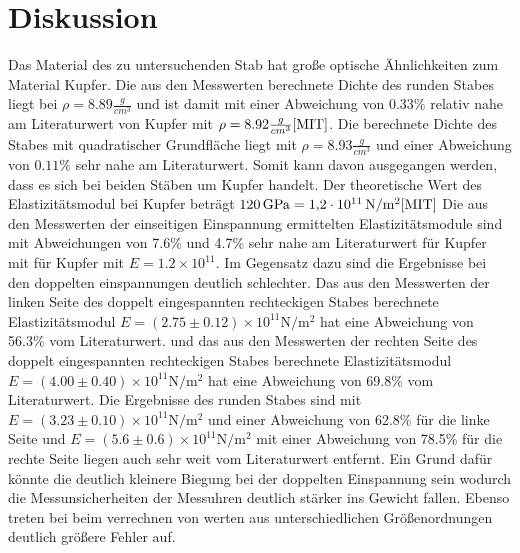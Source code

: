\section{Diskussion}
\label{sec:Diskussion}
Das Material des zu untersuchenden Stab hat große optische Ähnlichkeiten zum Material Kupfer. Die aus den Messwerten berechnete Dichte des runden Stabes liegt bei $\rho=8.89\frac{g}{cm^3}$ und ist damit mit einer Abweichung von $0.33\%$ relativ nahe am Literaturwert von Kupfer mit $\rho=8.92\frac{g}{cm^3} \cite{MIT}$.
\noindent Die berechnete Dichte des Stabes mit quadratischer Grundfläche liegt mit $\rho=8.93\frac{g}{cm^3}$ und einer Abweichung von $0.11\%$ sehr nahe am Literaturwert. Somit kann davon ausgegangen werden, dass es sich bei beiden Stäben um Kupfer handelt.
\noindent Der theoretische Wert des Elastizitätsmodul bei Kupfer beträgt $\qty{120}{\giga\pascal}=\qty{1.2e11}{\newton\per\meter\squared} \cite{MIT}$
Die aus den Messwerten der einseitigen Einspannung ermittelten Elastizitätsmodule sind mit Abweichungen von 7.6\% und 4.7\% sehr nahe am Literaturwert für Kupfer mit  für Kupfer mit $E=1.2\times10^{11}$.
\noindent Im Gegensatz dazu sind die Ergebnisse bei den doppelten einspannungen deutlich schlechter.
\noindent Das aus den Messwerten der linken Seite des doppelt eingespannten rechteckigen Stabes berechnete Elastizitätsmodul $E=(2.75 \pm 0.12) \times 10^{11} \unit{\newton\per\meter\squared}$ hat eine Abweichung von 56.3\% vom Literaturwert.
\noindent und das aus den Messwerten der rechten Seite des doppelt eingespannten rechteckigen Stabes berechnete Elastizitätsmodul $E=(4.00 \pm 0.40) \times 10^{11} \unit{\newton\per\meter\squared}$ hat eine Abweichung von 69.8\% vom Literaturwert.
\noindent Die Ergebnisse des runden Stabes sind mit $E=(3.23 \pm 0.10) \times 10^{11} \unit{\newton\per\meter\squared}$ und einer Abweichung von 62.8\% für die linke Seite und $E=(5.6 \pm 0.6) \times 10^{11} \unit{\newton\per\meter\squared}$ mit einer Abweichung von 78.5\% für die rechte Seite liegen auch sehr weit vom Literaturwert entfernt.
\noindent Ein Grund dafür könnte die deutlich kleinere Biegung bei der doppelten Einspannung sein wodurch die Messunsicherheiten der Messuhren deutlich stärker ins Gewicht fallen.
\noindent Ebenso treten bei beim verrechnen von werten aus unterschiedlichen Größenordnungen deutlich größere Fehler auf.